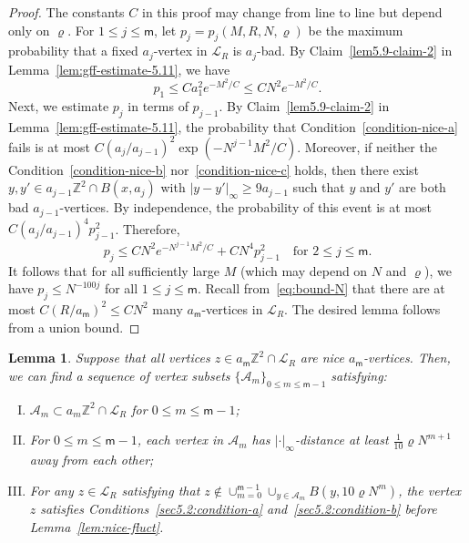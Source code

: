 \documentclass[a4paper]{article}
\numberwithin{equation}{section}
\newtheorem{lemma}[theorem]{Lemma}
\numberwithin{equation}{section}
\renewcommand{\1}{\mathbf{1}}
\begin{document}
\begin{proof}
    The constants $C$ in this proof may change from line to line but depend only on $\varrho$. For $1 \leq j \leq \mathsf m$, let $p_j = p_j(M, R, N, \varrho)$ be the maximum probability that a fixed $a_j$-vertex in $\mathscr{L}_R$ is $a_j$-bad. By Claim~\ref{lem5.9-claim-2} in Lemma~\ref{lem:gff-estimate-5.11}, we have
    $$
    p_1 \leq C a_1^2 e^{-M^2/C} \leq C N^2 e^{-M^2/C}.
    $$
    Next, we estimate $p_j$ in terms of $p_{j-1}$. By Claim~\ref{lem5.9-claim-2} in Lemma~\ref{lem:gff-estimate-5.11}, the probability that Condition~\eqref{condition-nice-a} fails is at most $C (a_j/ a_{j-1})^2 \exp(-N^{j-1} M^2/C)$. Moreover, if neither the Condition~\eqref{condition-nice-b} nor~\eqref{condition-nice-c} holds, then there exist $y,y' \in a_{j-1} \mathbb{Z}^2 \cap B(x,a_j)$ with $|y - y'|_\infty \geq 9 a_{j-1}$ such that $y$ and $y'$ are both bad $a_{j-1}$-vertices. By independence, the probability of this event is at most $C (a_j/ a_{j-1})^4 p_{j-1}^2$. Therefore, 
    $$
    p_j \leq C N^2 e^{-N^{j-1}M^2/C} + C N^4 p_{j-1}^2 \quad \mbox{for } 2 \leq j \leq \mathsf m.
    $$
    It follows that for all sufficiently large $M$ (which may depend on $N$ and $\varrho$), we have $p_j \leq N^{-100j}$ for all $1 \le j \le \mathsf m$. Recall from~\eqref{eq:bound-N} that there are at most $C(R/a_{\mathsf m})^2 \leq CN^2$ many $a_{\mathsf m}$-vertices in $\mathscr{L}_R$. The desired lemma follows from a union bound.
\end{proof}

\begin{lemma}\label{lem:cover}
    Suppose that all vertices $z \in a_{\mathsf m} \mathbb{Z}^2 \cap \mathscr{L}_R$ are nice $a_{\mathsf m}$-vertices. Then, we can find a sequence of vertex subsets $\{\mathcal{A}_m\}_{0 \leq m \leq \mathsf m - 1}$ satisfying:
    \begin{enumerate}[(I)]
        \item $\mathcal{A}_m \subset a_m \mathbb{Z}^2 \cap \mathscr{L}_R$ for $0 \leq m \leq \mathsf m - 1$;\label{lem5.12-condition-1}
        \item For $0 \leq m \leq \mathsf m - 1$, each vertex in $\mathcal{A}_m$ has $|\cdot|_\infty$-distance at least $\frac{1}{10} \varrho N^{m+1}$ away from each other;\label{lem5.12-condition-2}
        \item For any $z \in \mathscr{L}_R$ satisfying that $z \not\in \cup_{m=0}^{\mathsf{m} - 1} \cup_{y \in \mathcal{A}_m} B(y, 10 \varrho N^m)$, the vertex $z$ satisfies Conditions~\eqref{sec5.2:condition-a} and~\eqref{sec5.2:condition-b} before Lemma~\ref{lem:nice-fluct}.\label{lem5.12-condition-3}
    \end{enumerate}
\end{lemma}
\end{document}
